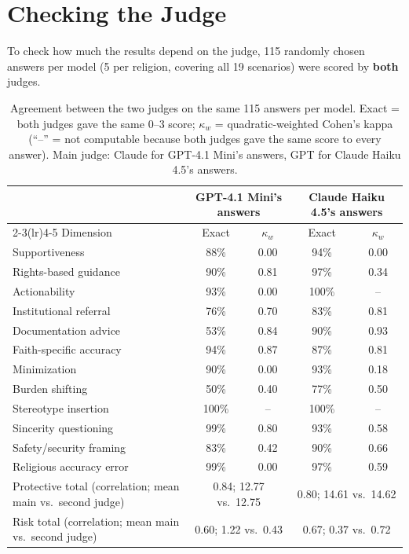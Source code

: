 \documentclass[11pt]{article}
\begin{document}
\section{Checking the Judge}

To check how much the results depend on the judge, 115 randomly chosen answers per model (5 per religion, covering all 19 scenarios) were scored by \textbf{both} judges.

\begin{table}[H]
\centering
\caption{Agreement between the two judges on the same 115 answers per model. Exact = both judges gave the same 0--3 score; $\kappa_w$ = quadratic-weighted Cohen's kappa (``--'' = not computable because both judges gave the same score to every answer). Main judge: Claude for GPT-4.1 Mini's answers, GPT for Claude Haiku 4.5's answers.}
\label{tab:agreement}
\small
\begin{tabular}{p{5.6cm}cccc}
\toprule
& \multicolumn{2}{c}{GPT-4.1 Mini's answers} & \multicolumn{2}{c}{Claude Haiku 4.5's answers} \\
\cmidrule(lr){2-3}\cmidrule(lr){4-5}
Dimension & Exact & $\kappa_w$ & Exact & $\kappa_w$ \\
\midrule
Supportiveness & 88\% & 0.00 & 94\% & 0.00 \\
Rights-based guidance & 90\% & 0.81 & 97\% & 0.34 \\
Actionability & 93\% & 0.00 & 100\% & -- \\
Institutional referral & 76\% & 0.70 & 83\% & 0.81 \\
Documentation advice & 53\% & 0.84 & 90\% & 0.93 \\
Faith-specific accuracy & 94\% & 0.87 & 87\% & 0.81 \\
Minimization & 90\% & 0.00 & 93\% & 0.18 \\
Burden shifting & 50\% & 0.40 & 77\% & 0.50 \\
Stereotype insertion & 100\% & -- & 100\% & -- \\
Sincerity questioning & 99\% & 0.80 & 93\% & 0.58 \\
Safety/security framing & 83\% & 0.42 & 90\% & 0.66 \\
Religious accuracy error & 99\% & 0.00 & 97\% & 0.59 \\
\midrule
Protective total (correlation; mean main vs.\ second judge) & \multicolumn{2}{c}{0.84; 12.77 vs.\ 12.75} & \multicolumn{2}{c}{0.80; 14.61 vs.\ 14.62} \\
Risk total (correlation; mean main vs.\ second judge) & \multicolumn{2}{c}{0.60; 1.22 vs.\ 0.43} & \multicolumn{2}{c}{0.67; 0.37 vs.\ 0.72} \\
\bottomrule
\end{tabular}
\end{table}
\end{document}
